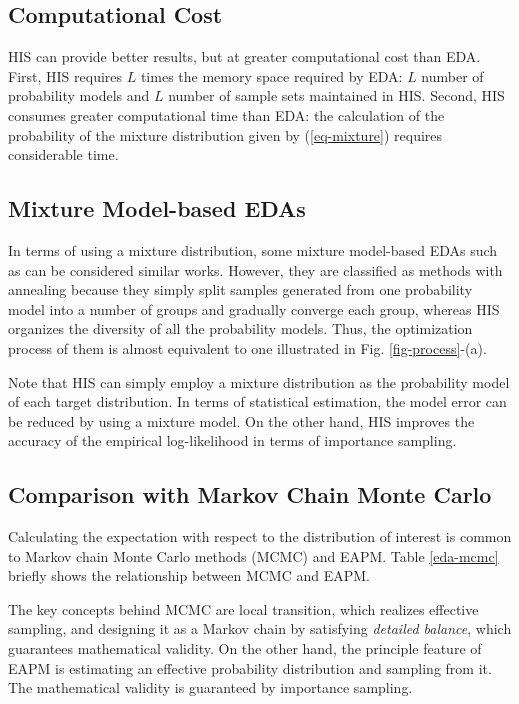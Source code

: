 \subsection{Computational Cost}
HIS can provide better results,
but at greater computational cost than EDA.
First, HIS requires $L$ times the memory space required by EDA:
$L$ number of probability models and 
$L$ number of sample sets maintained in HIS. 
Second, HIS consumes greater computational time than EDA:
the calculation of the probability of the mixture distribution
given by (\ref{eq-mixture}) requires considerable time.

\subsection{Mixture Model-based EDAs}
In terms of using a mixture distribution,
some mixture model-based EDAs such as
\cite{pelikan:mixture} can be considered similar works.
However, they are classified as methods with annealing
because they simply split samples generated from one probability
model into a number of groups and
gradually converge each group,
whereas HIS organizes the diversity of all the probability models.
Thus, the optimization process of them is almost equivalent to
one illustrated in  Fig. \ref{fig-process}-(a).

Note that HIS can simply employ a mixture distribution as the
probability model of each target distribution.
In terms of statistical estimation,
the model error can be reduced by using a mixture model.
On the other hand, HIS improves the accuracy
of the empirical log-likelihood in terms of importance sampling.


\subsection{Comparison with Markov Chain Monte Carlo}
\label{app-mcmc}

Calculating the expectation with respect to the distribution of interest
is common to 
Markov chain Monte Carlo methods (MCMC) \cite{bishop:ml} and EAPM.
Table \ref{eda-mcmc} briefly shows the relationship between
MCMC and EAPM.

The key concepts behind MCMC are local transition,
which realizes effective sampling,
and designing it as a
Markov chain by satisfying {\it detailed balance}, 
which guarantees mathematical validity.
On the other hand,
the principle feature of EAPM is estimating 
an effective probability distribution
and sampling from it.
The mathematical validity is guaranteed by importance sampling.

